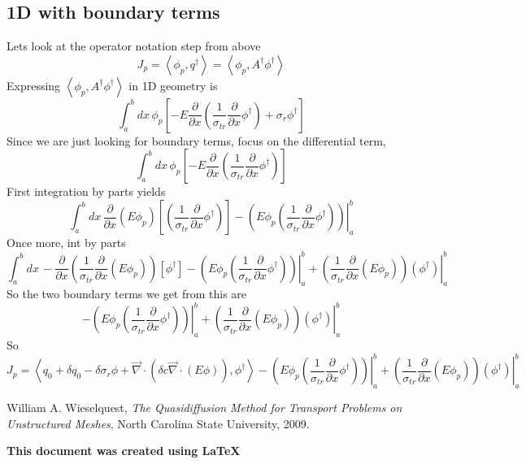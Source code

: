 \documentclass{article}
\newcommand{\bra}{\left\langle}
\newcommand{\ket}{\right\rangle}
\newcommand{\vdiv}{\vec{\nabla} \cdot}
\newcommand{\pdx}{\frac{\partial}{\partial x}}
\begin{document}
\subsection{1D with boundary terms}
Lets look at the operator notation step from above
\[
J_p = \bra \phi_p , q^\dag \ket = \bra \phi_p , A^\dag \phi^\dag\ket
\]
Expressing $\bra \phi_p , A^\dag \phi^\dag\ket$ in 1D geometry is
\[\int_a^b dx \, \phi_p \left[ - E  \pdx \left( \frac{1}{\sigma_{tr}} \pdx \phi^\dag \right) 
+ \sigma_r \phi^\dag \right]
\]
Since we are just looking for boundary terms, focus on the differential term,
\[\int_a^b dx \, \phi_p \left[ - E  \pdx \left( \frac{1}{\sigma_{tr}} \pdx \phi^\dag \right) \right]
\]
First integration by parts yields
\[\int_a^b dx \, \pdx \left( E \phi_p \right) \left[ \left( \frac{1}{\sigma_{tr}} \pdx \phi^\dag \right) \right] - \left. \left( E \phi_p   \left( \frac{1}{\sigma_{tr}} \pdx \phi^\dag \right) \right)  \right|_a^b
\]
Once more, int by parts
\[\int_a^b dx \,   - \pdx \left( \frac{1}{\sigma_{tr}} \pdx \left( E \phi_p \right) \right)  \left[ \phi^\dag \right] - \left. \left( E \phi_p   \left( \frac{1}{\sigma_{tr}} \pdx \phi^\dag \right) \right)  \right|_a^b + \left. \left( \frac{1}{\sigma_{tr}} \pdx \left( E \phi_p \right) \right) (\phi^\dag) \right|_a^b 
\]
So the two boundary terms we get from this are
\[
- \left. \left( E \phi_p   \left( \frac{1}{\sigma_{tr}} \pdx \phi^\dag \right) \right)  \right|_a^b + \left. \left( \frac{1}{\sigma_{tr}} \pdx \left( E \phi_p \right) \right) (\phi^\dag) \right|_a^b
\]
So
\[
J_p = \bra q_0 + \delta q_0 - \delta \sigma_r \phi + \vdiv \left( \delta c \vdiv \left( E \phi \right) \right), \phi^\dag \ket - \left. \left( E \phi_p   \left( \frac{1}{\sigma_{tr}} \pdx \phi^\dag \right) \right)  \right|_a^b + \left. \left( \frac{1}{\sigma_{tr}} \pdx \left( E \phi_p \right) \right) (\phi^\dag) \right|_a^b
\]

\newpage

\begin{thebibliography}{9}


  William A. Wieselquest, \emph{The Quasidiffusion Method for Transport Problems on Unstructured Meshes}, North Carolina State University, 2009.




\end{thebibliography}

\textbf{This document was created using \LaTeX}
\end{document}
